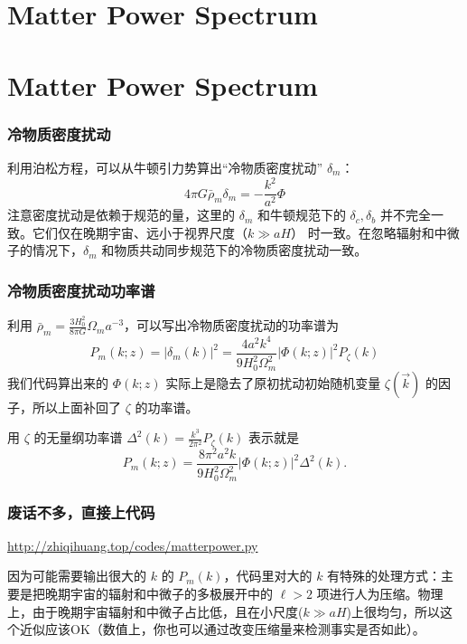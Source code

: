 \documentclass[CJK,13pt]{beamer}
\date{}
\begin{document}
  \bch

  \section{Matter Power Spectrum}

  
  \section{Matter Power Spectrum}

  
  \begin{frame}
    \frametitle{冷物质密度扰动}
    利用泊松方程，可以从牛顿引力势算出“冷物质密度扰动” $\delta_m$：
    $$ 4\pi G\bar{\rho}_m \delta_m = -\frac{k^2}{a^2}\Phi $$
    注意密度扰动是依赖于规范的量，这里的 $\delta_m$ 和牛顿规范下的 $\delta_c, \delta_b$ 并不完全一致。它们仅在晚期宇宙、远小于视界尺度（$k\gg aH$） 时一致。在忽略辐射和中微子的情况下，$\delta_m$ 和物质共动同步规范下的冷物质密度扰动一致。
  \end{frame}

  \begin{frame}
    \frametitle{冷物质密度扰动功率谱}
    利用 $\bar{\rho}_m = \frac{3H_0^2}{8\pi G}\Omega_m a^{-3}$，可以写出冷物质密度扰动的功率谱为
    $$P_m(k; z) = |\delta_m(k)|^2 = \frac{4a^2k^4}{9H_0^2\Omega_m^2} \lvert\Phi(k;z)\rvert^2 P_\zeta(k)$$
    我们代码算出来的 $\Phi(k; z)$ 实际上是隐去了原初扰动初始随机变量 $\zeta(\vec{k})$ 的因子，所以上面补回了 $\zeta$ 的功率谱。

    用 $\zeta$ 的无量纲功率谱  $\Delta^2(k)=\frac{k^3}{2\pi^2}P_\zeta(k)$ 表示就是
    $$P_m(k; z) = \frac{8\pi^2a^2k}{9H_0^2\Omega_m^2} \lvert\Phi(k;z)\rvert^2 \Delta^2(k).$$
  \end{frame}


  \begin{frame}
    \frametitle{废话不多，直接上代码}
    \url{http://zhiqihuang.top/codes/matterpower.py}

    \skipline
    
    因为可能需要输出很大的 $k$ 的 $P_m(k)$，代码里对大的 $k$ 有特殊的处理方式：主要是把晚期宇宙的辐射和中微子的多极展开中的 $\ell>2$ 项进行人为压缩。物理上，由于晚期宇宙辐射和中微子占比低，且在小尺度($k\gg aH$)上很均匀，所以这个近似应该OK（数值上，你也可以通过改变压缩量来检测事实是否如此）。
  \end{frame}
\end{document}
